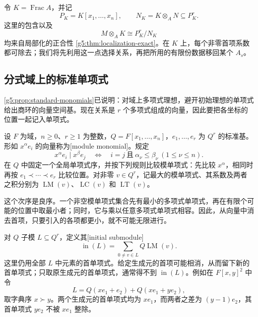 \ProseParagraphBreak

令 \(K=\operatorname{Frac}A\)，并记
\[
	P_K=K[x_1,\ldots,x_n],\qquad
	N_K=K\otimes_A N\subseteq P_K^r.
\]
这里的包含以及
\[
	M\otimes_A K\cong P_K^r/N_K
\]
均来自局部化的正合性 \cref{g5:thm:localization-exact}。在 \(K\) 上，每个非零首项系数都可除去；我们将先利用这一点选择关系，再把所用的有限份数据移回某个 \(A_s\)。

\subsection{分式域上的标准单项式}
\label{g5:subsec:0603:02}

\cref{g5:prop:standard-monomials}已说明：对域上多项式理想，避开初始理想的单项式给出商环的向量空间基。现在关系是 \(r\) 个多项式组成的向量，因此要把各坐标的位置一起记入单项式。

\begin{definition}\label{g5:def:module-monomials}
	设 \(F\) 为域，\(n\geq0\)、\(r\geq1\) 为整数，\(Q=F[x_1,\ldots,x_n]\)，\(e_1,\ldots,e_r\) 为 \(Q^r\) 的标准基。形如 \(x^\alpha e_i\) 的向量称为[module monomial]。规定
	\[
		x^\alpha e_i\mid x^\beta e_j
		\quad\Longleftrightarrow\quad
		i=j\ \text{且}\ \alpha_\nu\leq\beta_\nu\ (1\leq\nu\leq n).
	\]
	在 \(Q\) 中固定一个全局单项式序，并按下列规则比较模单项式：先比较 \(x^\alpha\)，相同时再按 \(e_1\prec\cdots\prec e_r\) 比较位置。对非零 \(v\in Q^r\)，记最大的模单项式、其系数及两者之积分别为
	\(\operatorname{LM}(v)\)、\(\operatorname{LC}(v)\) 和 \(\operatorname{LT}(v)\)。
\end{definition}

这个次序是良序。一个非空模单项式集合先有最小的多项式单项式，再在有限个可能的位置中取最小者；同时，它与乘以任意多项式单项式相容。因此，从向量中消去首项，只要引入的各项都更小，就不可能无限进行。

\ProseParagraphBreak

对 \(Q\) 子模 \(L\subseteq Q^r\)，定义其[initial submodule]
\[
	\operatorname{in}(L)
	=\sum_{0\ne v\in L}Q\operatorname{LM}(v).
\]
这里仍用全部 \(L\) 中元素的首单项式。给定生成元的首项可能相消，从而留下新的首单项式；只取原生成元的首单项式，通常得不到 \(\operatorname{in}(L)\)。例如在 \(F[x,y]^2\) 中令
\[
	L=Q(xe_1+e_2)+Q(xe_1+ye_2),
\]
取字典序 \(x\succ y\)。两个生成元的首单项式均为 \(xe_1\)，而两者之差为 \((y-1)e_2\)，其首单项式 \(ye_2\) 不被 \(xe_1\) 整除。

